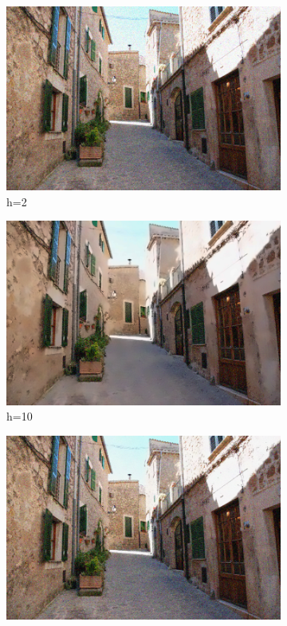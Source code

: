 \documentclass[11pt]{article}
\begin{document}
\begin{figure}[H]
	\centering
	\begin{subfigure}{.24\textwidth}
		\centering
		\includegraphics[width=\linewidth]{h2}
		\caption{h=2}
		\label{fig:h2}
	\end{subfigure}
	\begin{subfigure}{.24\textwidth}
		\centering
		\includegraphics[width=\linewidth]{h10}
		\caption{h=10}
		\label{fig:h10}
	\end{subfigure}
	\begin{subfigure}{.24\textwidth}
		\centering
		\includegraphics[width=\linewidth]{template2}

\end{subfigure}
\end{figure}
\end{document}
